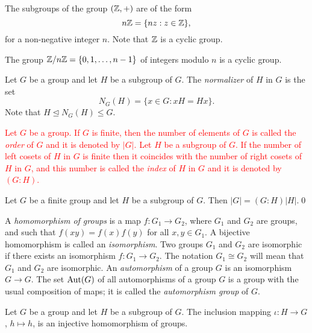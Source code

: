 \begin{example}
	The subgroups of the group $(\mathbb{Z},+)$ are of the form
	\[
	n\mathbb{Z}=\{ nz: z\in\mathbb{Z}\},
	\]
	for a non-negative integer $n$. Note that $\mathbb{Z}$ is a cyclic group.  
\end{example} 

\begin{example}
The group $\mathbb{Z}/n\mathbb{Z}=\{0,1,\dots,n-1\}$ of integers modulo $n$ is a cyclic group.
\end{example}

\begin{example} 
Let $G$ be a group and let $H$ be a subgroup of $G$. 
The \emph{normalizer} of $H$ in $G$ is the set
	\[
	N_G(H)=\{ x\in G: xH=Hx\}.
	\]
	Note that $H\unlhd N_G(H)\leq G$.
\end{example}

\textcolor{red}{Let $G$ be a group. If $G$ is finite, then the number of elements of $G$ is called the {\em order} of $G$ and it is denoted by $|G|$. Let $H$ be a subgroup of $G$. If the number of left cosets of $H$ in $G$ is finite then it coincides with the number of right cosets of $H$ in $G$, and this number is called the {\em index} 
of $H$ in $G$ and it is denoted by $(G:H)$.}

\begin{theorem}
Let $G$ be a finite group and let $H$ be a subgroup of $G$. 
Then $|G|=(G:H)|H|$.\qed
\end{theorem}

A {\em homomorphism of groups} is a map $f\colon G_1\rightarrow G_2$, where $G_1$ and $G_2$ 
are groups, and such that $f(xy)=f(x)f(y)$ for all $x,y\in G_1$. A bijective homomorphism is called an {\em isomorphism}. Two groups $G_1$ and $G_2$ are isomorphic if there exists an isomorphism $f\colon G_1\rightarrow G_2$. The notation $G_1\cong G_2$ will mean that $G_1$ and $G_2$ are isomorphic. 
An {\em automorphism} of a group $G$ is an isomorphism $G\to G$. The set $\operatorname{Aut}(G)$ of all automorphisms of a group $G$ is a group with the usual 
composition of maps; it is called the {\em automorphism group} of $G$.

\begin{example} 
    Let $G$ be a group and let $H$ be a subgroup of $G$. 
    The inclusion mapping $\iota\colon H\rightarrow G$, $h\mapsto h$, is an injective homomorphism of groups. 
\end{example}

